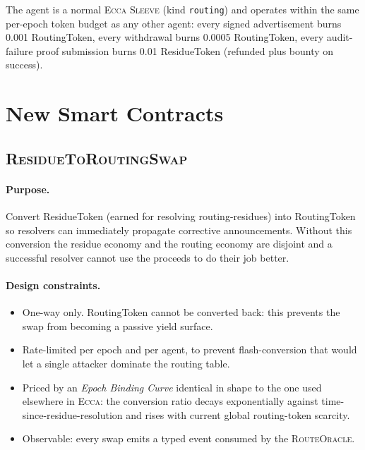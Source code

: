 \documentclass[11pt,twocolumn]{article}
\theoremstyle{definition}
\theoremstyle{plain}
\theoremstyle{remark}
\newcommand{\ecca}{\textsc{Ecca}}
\newcommand{\sleeve}{\textsc{Sleeve}}
\newcommand{\contractname}[1]{\textsc{#1}}
\newcommand{\code}[1]{\texttt{#1}}
\begin{document}
The agent is a normal \ecca{} \sleeve{} (kind \code{routing}) and operates within the same per-epoch token budget as any other agent: every signed advertisement burns 0.001 RoutingToken, every withdrawal burns 0.0005 RoutingToken, every audit-failure proof submission burns 0.01 ResidueToken (refunded plus bounty on success).

\section{New Smart Contracts}\label{sec:contracts}

\subsection{\contractname{ResidueToRoutingSwap}}\label{ssec:swap}

\paragraph{Purpose.} Convert ResidueToken (earned for resolving routing-residues) into RoutingToken so resolvers can immediately propagate corrective announcements. Without this conversion the residue economy and the routing economy are disjoint and a successful resolver cannot use the proceeds to do their job better.

\paragraph{Design constraints.}
\begin{itemize}[leftmargin=*,itemsep=2pt]
  \item One-way only. RoutingToken cannot be converted back: this prevents the swap from becoming a passive yield surface.
  \item Rate-limited per epoch and per agent, to prevent flash-conversion that would let a single attacker dominate the routing table.
  \item Priced by an \emph{Epoch Binding Curve} identical in shape to the one used elsewhere in \ecca{}: the conversion ratio decays exponentially against time-since-residue-resolution and rises with current global routing-token scarcity.
  \item Observable: every swap emits a typed event consumed by the \contractname{RouteOracle}.
\end{itemize}
\end{document}
